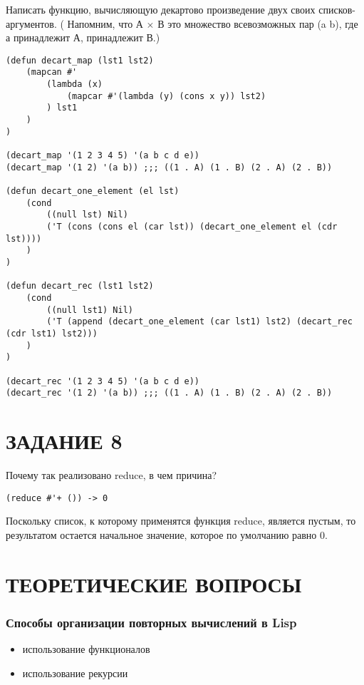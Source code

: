 Написать функцию, вычисляющую декартово произведение двух своих
списков-аргументов. ( Напомним, что А $\times$ В это множество
всевозможных пар (a b), где а принадлежит А, принадлежит В.)

\begin{lstlisting}
(defun decart_map (lst1 lst2)
    (mapcan #'
        (lambda (x)
            (mapcar #'(lambda (y) (cons x y)) lst2)
        ) lst1
    )
)

(decart_map '(1 2 3 4 5) '(a b c d e))
(decart_map '(1 2) '(a b)) ;;; ((1 . A) (1 . B) (2 . A) (2 . B))

(defun decart_one_element (el lst)
    (cond
        ((null lst) Nil)
        ('T (cons (cons el (car lst)) (decart_one_element el (cdr lst))))
    )
)

(defun decart_rec (lst1 lst2)
    (cond
        ((null lst1) Nil)
        ('T (append (decart_one_element (car lst1) lst2) (decart_rec (cdr lst1) lst2)))
    )
)

(decart_rec '(1 2 3 4 5) '(a b c d e))
(decart_rec '(1 2) '(a b)) ;;; ((1 . A) (1 . B) (2 . A) (2 . B))
\end{lstlisting}

\section{ЗАДАНИЕ 8}

Почему так реализовано reduce, в чем причина?

\begin{lstlisting}
(reduce #'+ ()) -> 0
\end{lstlisting}

Поскольку список, к которому применятся функция {\ttfamily reduce},
является пустым, то результатом остается начальное значение,
которое по умолчанию равно 0.

\section{ТЕОРЕТИЧЕСКИЕ ВОПРОСЫ}

\subsubsection{Способы организации повторных вычислений в Lisp}

\begin{itemize}
    \item использование функционалов
    \item использование рекурсии
\end{itemize}

